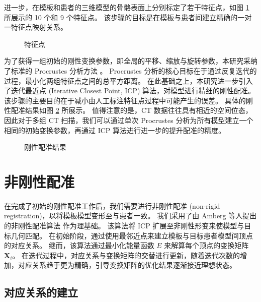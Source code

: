 进一步，在模板和患者的三维模型的骨骼表面上分别标定了若干特征点，如图 \ref{fig:landmarks} 所展示的 10 个和 9 个特征点。
该步骤的目标是在模板与患者间建立精确的一对一特征点映射关系。

\begin{figure}
  \centering
  \caption{特征点}
  \label{fig:landmarks}
\end{figure}

为了获得一组初始的刚性变换参数，即全局的平移、缩放与旋转参数，本研究采纳了标准的 Procrustes 分析方法 \cite{rossProcrustesAnalysis2004}。
Procrustes 分析的核心目标在于通过反复迭代的过程，最小化两组特征点之间的总平方距离。
在此基础之上，本研究进一步引入了迭代最近点 (Iterative Closest Point, ICP) 算法，对模型进行精细的刚性配准。
该步骤的主要目的在于减小由人工标注特征点过程中可能产生的误差。
具体的刚性配准结果如图 \ref{fig:align} 所展示。
值得注意的是，CT 数据往往具有相近的空间位态，因此对于多组 CT 扫描，我们可以通过单次 Procrustes 分析为所有模型建立一个相同的初始变换参数，再通过 ICP 算法进行进一步的提升配准的精度。

\begin{figure}
  \centering
  \caption{刚性配准结果}
  \label{fig:align}
\end{figure}

\section{非刚性配准}

在完成了初始的刚性配准工作后，我们需要进行非刚性配准 (non-rigid registration)，以将模板模型变形至与患者一致。
我们采用了由 Amberg 等人提出的非刚性配准算法 \cite{ambergOptimalStepNonrigid2007} 作为理基础。
该算法将 ICP 扩展至非刚性形变来使模型与目标几何匹配。
在初始阶段，通过使用最邻近点来建立模板与目标患者模型间顶点的对应关系。
继而，该算法通过最小化能量函数 $E$ 来解算每个顶点的变换矩阵 $\bm{X}_i$。
在迭代过程中，对应关系与变换矩阵的交替进行更新，随着迭代次数的增加，对应关系趋于更为精确，引导变换矩阵的优化结果逐渐接近理想状态。

\subsection{对应关系的建立}

